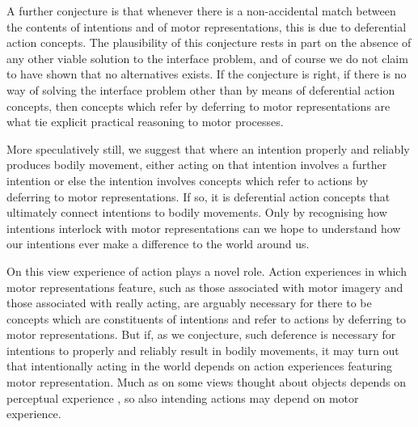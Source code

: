\documentclass[12pt,\papersize]{extarticle}
\begin{document}
A further conjecture is that whenever there is a non-accidental match between the contents of intentions and of motor representations, this is due to deferential action concepts. The plausibility of this conjecture rests in part on the absence of any other viable solution to the interface problem, and of course we do not claim to have shown that no alternatives exists. If the conjecture is right, if there is no way of solving the interface problem other than by means of deferential action concepts, then concepts which refer by deferring to motor representations are what tie explicit practical reasoning to motor processes.

More speculatively still, we suggest that where an intention properly and reliably produces bodily movement, either acting on that intention involves a further intention or else the intention involves concepts which refer to actions by deferring to motor representations. If so, it is deferential action concepts that ultimately connect intentions to bodily movements. Only by recognising how intentions interlock with motor representations can we hope to understand how our intentions ever make a difference to the world around us.

On this view experience of action plays a novel role. Action experiences in which motor representations feature, such as those associated with motor imagery and those associated with really acting, are arguably necessary for there to be concepts which are constituents of intentions and refer to actions by deferring to motor representations. But if, as we conjecture, such deference is necessary for intentions to properly and reliably result in bodily movements, it may turn out that intentionally acting in the world depends on action experiences featuring motor representation. Much as on some views thought about objects depends on perceptual experience \citep[e.g.][]{Campbell:2002ge}, so also intending actions may depend on motor experience.  







\end{document}
